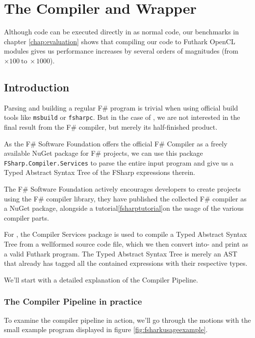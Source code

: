 \chapter{The \fshark{} Compiler and Wrapper}
Although \fshark{} code can be executed directly in \fsharp{} as normal
\fsharp{} code, our benchmarks in chapter \ref{chap:evaluation} shows
that compiling our \fshark{} code to Futhark OpenCL modules gives us performance
increases by several orders of magnitudes (from $\times 100~\text{to}~\times 1000$).

\section*{Introduction}
\label{sec:fsharkcompiler}


Parsing and building a regular F\# program is trivial when using official build tools like
\texttt{msbuild} or \texttt{fsharpc}.
But in the case of \fshark{}, we are not interested in the final result from the
F\# compiler, but merely its half-finished product.

As the F\# Software Foundation offers the official F\# Compiler as a freely
available NuGet package for F\# projects, we can use this package
\texttt{FSharp.Compiler.Services} to parse the entire input \fshark{} program and
give us a Typed Abstract Syntax Tree of the FSharp expressions therein.

The F\# Software Foundation actively encourages developers to create projects
using the F\# compiler library, they have published the collected F\# compiler
as a NuGet package, alongside a tutorial\ref{fsharptutorial}on the usage of the
various compiler parts.

For \fshark{}, the Compiler Services package is used to compile a Typed Abstract
Syntax Tree from a wellformed \fshark{} source code file, which we then
convert into- and print as a valid Futhark program.
The Typed Abstract Syntax Tree is merely an AST that already has tagged all the
contained expressions with their respective types.

We'll start with a detailed explanation of the \fshark{} Compiler Pipeline.

\subsection*{The \fshark{} Compiler Pipeline in practice}
To examine the compiler pipeline in action, we'll go through the motions with
the small example program displayed in figure \ref{fig:fsharkusageexample}.

